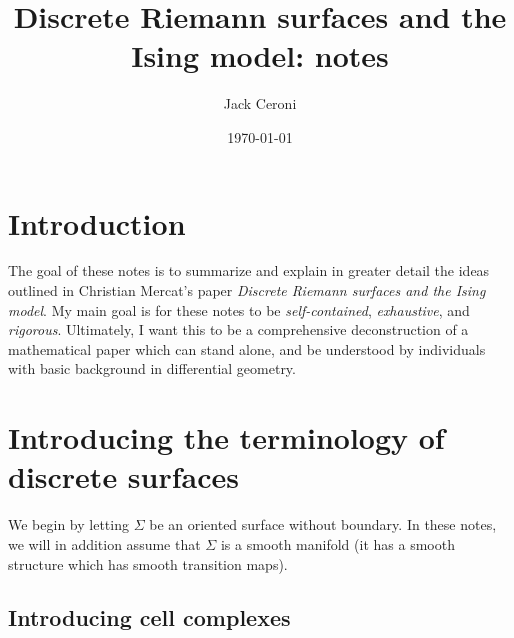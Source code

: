 \documentclass[aps,pra,showpacs,notitlepage,onecolumn,superscriptaddress,nofootinbib]{revtex4-1}
\theoremstyle{definition}
\newtheorem{definition}{Definition}[section]
\begin{document}
\title{Discrete Riemann surfaces and the Ising model: notes}
\author{Jack Ceroni}

\date{\today}

\maketitle

\section{Introduction}

\noindent The goal of these notes is to summarize and explain in greater detail the ideas outlined in Christian Mercat's paper \emph{Discrete Riemann surfaces and the Ising model}.
My main goal is for these notes to be \emph{self-contained}, \emph{exhaustive}, and \emph{rigorous}. Ultimately, I want this to be a comprehensive deconstruction of a mathematical paper
which can stand alone, and be understood by individuals with basic background in differential geometry.

\section{Introducing the terminology of discrete surfaces}

\noindent We begin by letting $\Sigma$ be an oriented surface without boundary. In these notes, we will in addition assume that $\Sigma$ is a smooth manifold (it has a smooth structure which
has smooth transition maps).

\subsection{Introducing cell complexes}
\end{document}
